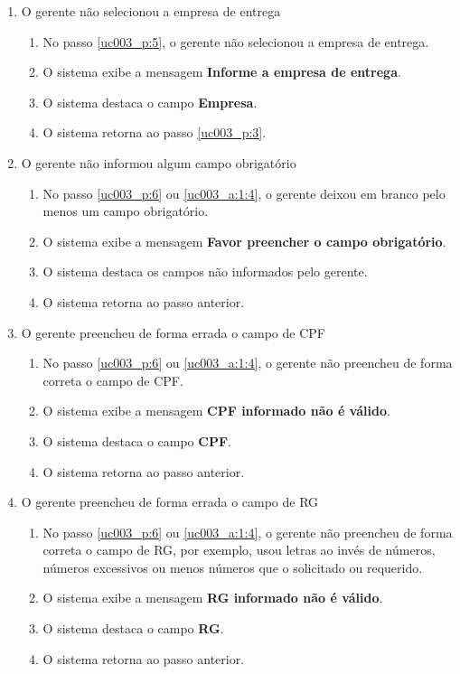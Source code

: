 \begin{enumerate}[label=E\arabic*]
	\item O gerente não selecionou a empresa de entrega \label{uc003_e:1}
	\begin{enumerate}[label*=.\arabic*]
		\item[] No passo \ref{uc003_p:5}, o gerente não selecionou a empresa de entrega.
		\item O sistema exibe a mensagem \textbf{Informe a empresa de entrega}.
		\item O sistema destaca o campo \textbf{Empresa}.
		\item O sistema retorna ao passo \ref{uc003_p:3}.
	\end{enumerate}
	
	\item O gerente não informou algum campo obrigatório \label{uc003_e:2}
	\begin{enumerate}[label*=.\arabic*]
		\item[] No passo \ref{uc003_p:6} ou \ref{uc003_a:1:4}, o gerente deixou em branco pelo menos um campo obrigatório.
		\item O sistema exibe a mensagem \textbf{Favor preencher o campo obrigatório}.
		\item O sistema destaca os campos não informados pelo gerente.
		\item O sistema retorna ao passo anterior.
	\end{enumerate}

	\item O gerente preencheu de forma errada o campo de CPF \label{uc003_e:3}
	\begin{enumerate}[label*=.\arabic*]		
		\item[] No passo \ref{uc003_p:6} ou \ref{uc003_a:1:4}, o gerente não preencheu de forma correta o campo de CPF.		
		\item O sistema exibe a mensagem \textbf{CPF informado não é válido}.
		\item O sistema destaca o campo \textbf{CPF}.
		\item O sistema retorna ao passo anterior.
	\end{enumerate}

	\item O gerente preencheu de forma errada o campo de RG \label{uc003_e:4}
	\begin{enumerate}[label*=.\arabic*]		
		\item[] No passo \ref{uc003_p:6} ou \ref{uc003_a:1:4}, o gerente não preencheu de forma correta o campo de RG, por exemplo, usou letras ao invés de números, números excessivos ou menos números que o solicitado ou requerido.		
		\item O sistema exibe a mensagem \textbf{RG informado não é válido}.
		\item O sistema destaca o campo \textbf{RG}.
		\item O sistema retorna ao passo anterior.
	\end{enumerate}
		

\end{enumerate}
